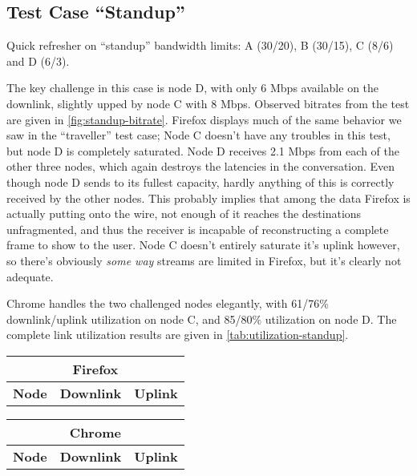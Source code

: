 \subsection{Test Case ``Standup''}

Quick refresher on ``standup'' bandwidth limits: A (30/20), B (30/15), C (8/6) and D (6/3).

The key challenge in this case is node D, with only 6 Mbps available on the downlink, slightly upped by node C with 8 Mbps. Observed bitrates from the test are given in \autoref{fig:standup-bitrate}. Firefox displays much of the same behavior we saw in the ``traveller'' test case; Node C doesn't have any troubles in this test, but node D is completely saturated. Node D receives 2.1 Mbps from each of the other three nodes, which again destroys the latencies in the conversation. Even though node D sends to its fullest capacity, hardly anything of this is correctly received by the other nodes. This probably implies that among the data Firefox is actually putting onto the wire, not enough of it reaches the destinations unfragmented, and thus the receiver is incapable of reconstructing a complete frame to show to the user. Node C doesn't entirely saturate it's uplink however, so there's obviously \emph{some way} streams are limited in Firefox, but it's clearly not adequate.

Chrome handles the two challenged nodes elegantly, with 61/76\% downlink/uplink utilization on node C, and 85/80\% utilization on node D. The complete link utilization results are given in \autoref{tab:utilization-standup}.

\clearpage
\begin{center}
    \label{tab:utilization-standup}
    \begin{tabular}{| l | l | l |}
    \multicolumn{3}{c}{\textbf{Firefox}} \\ \hline
    \textbf{Node} & \textbf{Downlink} & \textbf{Uplink} \\ \hline
    
    \hline
    \end{tabular}
    \begin{tabular}{| l | l | l |}
    \multicolumn{3}{c}{\textbf{Chrome}} \\ \hline
    \textbf{Node} & \textbf{Downlink} & \textbf{Uplink} \\ \hline
    
    \hline
    \end{tabular}
\end{center}

